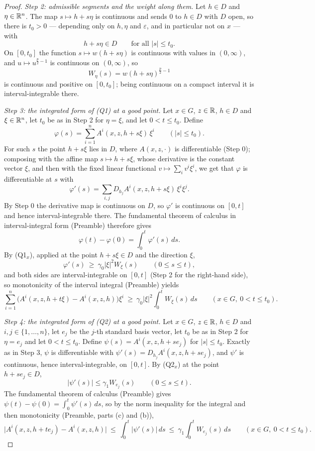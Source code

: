 \begin{proof}
\emph{Step 2: admissible segments and the weight along them.}  Let $h\in D$ and
$\eta\in\mathbb{R}^n$.  The map $s\mapsto h+s\eta$ is continuous and sends $0$ to
$h\in D$ with $D$ open, so there is $t_0>0$ --- depending only on $h,\eta$ and
$\varepsilon$, and in particular not on $x$ --- with
\[
h+s\eta\in D\qquad\text{for all }|s|\le t_0 .
\]
On $[0,t_0]$ the function $s\mapsto w(h+s\eta)$ is continuous with values in
$(0,\infty)$, and $u\mapsto u^{\frac p2-1}$ is continuous on $(0,\infty)$, so
\[
W_\eta(s)=w(h+s\eta)^{\frac p2-1}
\]
is continuous and positive on $[0,t_0]$; being continuous on a compact interval
it is interval-integrable there.

\emph{Step 3: the integrated form of (Q1) at a good point.}  Let $x\in G$,
$z\in\mathbb{R}$, $h\in D$ and $\xi\in\mathbb{R}^n$, let $t_0$ be as in Step 2 for
$\eta=\xi$, and let $0<t\le t_0$.  Define
\[
\varphi(s)=\sum_{i=1}^nA^i(x,z,h+s\xi)\,\xi^i\qquad(|s|\le t_0).
\]
For such $s$ the point $h+s\xi$ lies in $D$, where $A(x,z,\cdot)$ is
differentiable (Step 0); composing with the affine map $s\mapsto h+s\xi$, whose
derivative is the constant vector $\xi$, and then with the fixed linear
functional $v\mapsto\sum_iv^i\xi^i$, we get that $\varphi$ is differentiable at
$s$ with
\[
\varphi'(s)=\sum_{i,j}D_{h_j}A^i(x,z,h+s\xi)\,\xi^i\xi^j .
\]
By Step 0 the derivative map is continuous on $D$, so $\varphi'$ is continuous
on $[0,t]$ and hence interval-integrable there.  The fundamental theorem of
calculus in interval-integral form (Preamble) therefore gives
\[
\varphi(t)-\varphi(0)=\int_0^t\varphi'(s)\,ds .
\]
By (Q1$_x$), applied at the point $h+s\xi\in D$ and the direction $\xi$,
\[
\varphi'(s)\ \ge\ \gamma_0|\xi|^2W_\xi(s)\qquad(0\le s\le t),
\]
and both sides are interval-integrable on $[0,t]$ (Step 2 for the right-hand
side), so monotonicity of the interval integral (Preamble) yields
\[
\sum_{i=1}^n\bigl(A^i(x,z,h+t\xi)-A^i(x,z,h)\bigr)\xi^i
\ \ge\ \gamma_0|\xi|^2\int_0^tW_\xi(s)\,ds
\qquad(x\in G,\ 0<t\le t_0).
\tag{1}
\]

\emph{Step 4: the integrated form of (Q2) at a good point.}  Let $x\in G$,
$z\in\mathbb{R}$, $h\in D$ and $i,j\in\{1,\dots,n\}$, let $e_j$ be the $j$-th standard
basis vector, let $t_0$ be as in Step 2 for $\eta=e_j$ and let $0<t\le t_0$.
Define $\psi(s)=A^i(x,z,h+se_j)$ for $|s|\le t_0$.  Exactly as in Step 3,
$\psi$ is differentiable with
$\psi'(s)=D_{h_j}A^i(x,z,h+se_j)$, and $\psi'$ is continuous, hence
interval-integrable, on $[0,t]$.  By (Q2$_x$) at the point $h+se_j\in D$,
\[
|\psi'(s)|\le\gamma_1W_{e_j}(s)\qquad(0\le s\le t).
\]
The fundamental theorem of calculus (Preamble) gives
$\psi(t)-\psi(0)=\int_0^t\psi'(s)\,ds$, so by the norm inequality for the
integral and then monotonicity (Preamble, parts (c) and (b)),
\[
\bigl|A^i(x,z,h+te_j)-A^i(x,z,h)\bigr|
\ \le\ \int_0^t|\psi'(s)|\,ds
\ \le\ \gamma_1\int_0^tW_{e_j}(s)\,ds
\qquad(x\in G,\ 0<t\le t_0).
\tag{2}
\]


\end{proof}
